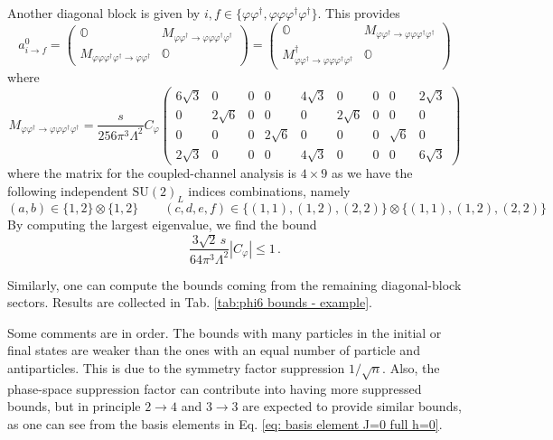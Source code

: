 \documentclass[a4paper,11pt]{article}
\begin{document}
Another diagonal block is given by $i,f\in\{\varphi\varphi^\dag,\varphi\varphi\varphi^\dag\varphi^\dag\}$. This provides
\begin{equation}
    a^0_{i\to f}=\begin{pmatrix}
        \mathbb{O} & M_{\varphi\varphi^\dag\to \varphi\varphi\varphi^\dag\varphi^\dag}\\ M_{\varphi\varphi\varphi^\dag\varphi^\dag\to \varphi\varphi^\dag} & \mathbb{O}
    \end{pmatrix}=\begin{pmatrix}
        \mathbb{O} & M_{\varphi\varphi^\dag\to \varphi\varphi\varphi^\dag\varphi^\dag}\\ M^\dag_{\varphi\varphi^\dag\to \varphi\varphi\varphi^\dag\varphi^\dag} & \mathbb{O}
    \end{pmatrix}
\end{equation}
where
\begin{equation}
    M_{\varphi\varphi^\dag\to \varphi\varphi\varphi^\dag\varphi^\dag}=\frac{s}{256\pi^3\Lambda^2}C_\varphi\begin{pmatrix}
        6\sqrt{3} & 0 & 0 & 0 & 4\sqrt{3} & 0 & 0 & 0 & 2\sqrt{3} \\ 0 & 2\sqrt{6} & 0 & 0 & 0 & 2\sqrt{6} & 0 & 0 & 0  \\ 0 & 0 & 0 & 2\sqrt{6} & 0 & 0 & 0 & \sqrt{6} & 0 \\ 2\sqrt{3} & 0 & 0 & 0 & 4\sqrt{3} & 0 & 0 & 0 & 6\sqrt{3}
    \end{pmatrix}
\end{equation}
where the matrix for the coupled-channel analysis is $4\times 9$ as we have the following independent $\mathrm{SU}(2)_L$ indices combinations, namely
\begin{equation}
    (a,b)\in \{1,2\}\otimes \{1,2\}\qquad (c,d,e,f)\in\{(1,1),(1,2),(2,2)\}\otimes \{(1,1),(1,2),(2,2)\}
\end{equation}
By computing the largest eigenvalue, we find the bound
\begin{equation}
    \frac{3\sqrt{2}\,s}{64\pi^3\Lambda^2}|C_\varphi|\leq 1\,.
\end{equation}

Similarly, one can compute the bounds coming from the remaining diagonal-block sectors. Results are collected in Tab. \ref{tab:phi6 bounds - example}.

Some comments are in order. The bounds with many particles in the initial or final states are weaker than the ones with an equal number of particle and antiparticles. This is due to the symmetry factor suppression $1/\sqrt{n}$. Also, the phase-space suppression factor can contribute into having more suppressed bounds, but in principle $2\to4$ and $3\to3$ are expected to provide similar bounds, as one can see from the basis elements in Eq. \eqref{eq: basis element J=0 full h=0}.
\end{document}
